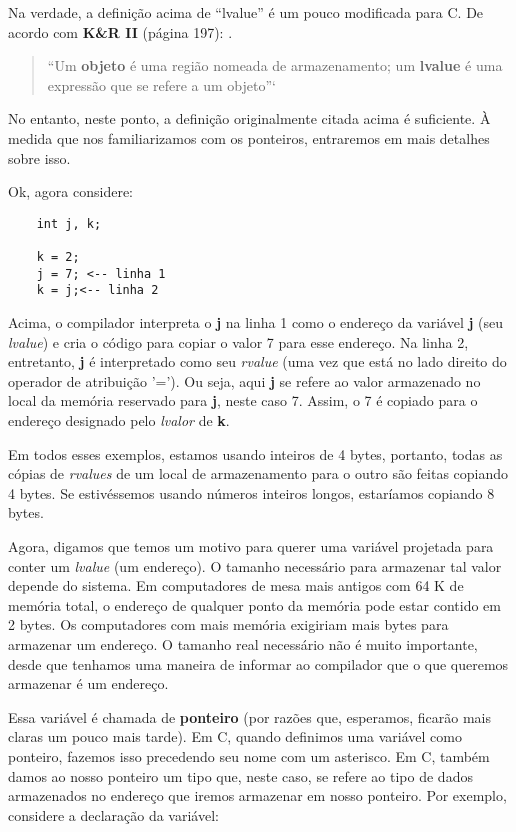 Na verdade, a definição acima de ``lvalue'' é um pouco modificada para C. De acordo com \textbf{K\&R II} (página 197): \cite{kr}.

\begin{quotation}
	``Um \textbf{objeto} é uma região nomeada de armazenamento; um \textbf{lvalue} é uma expressão que se refere a um objeto''`
\end{quotation}

No entanto, neste ponto, a definição originalmente citada acima é suficiente. À medida que nos familiarizamos com os ponteiros, entraremos em mais detalhes sobre isso.

Ok, agora considere:

\begin{lstlisting}
	int j, k;
	
	k = 2;
	j = 7; <-- linha 1
	k = j;<-- linha 2
\end{lstlisting}

Acima, o compilador interpreta o \textbf{j} na linha 1 como o endereço da variável \textbf{j} (seu \textit{lvalue}) e cria o código para copiar o valor 7 para esse endereço. Na linha 2, entretanto, \textbf{j} é interpretado como seu \textit{rvalue} (uma vez que está no lado direito do operador de atribuição '='). Ou seja, aqui \textbf{j} se refere ao valor armazenado no local da memória reservado para \textbf{j}, neste caso 7. Assim, o 7 é copiado para o endereço designado pelo \textit{lvalor} de \textbf{k}.

Em todos esses exemplos, estamos usando inteiros de 4 bytes, portanto, todas as cópias de \textit{rvalues} de um local de armazenamento para o outro são feitas copiando 4 bytes. Se estivéssemos usando números inteiros longos, estaríamos copiando 8 bytes.

Agora, digamos que temos um motivo para querer uma variável projetada para conter um \textit{lvalue} (um endereço). O tamanho necessário para armazenar tal valor depende do sistema. Em computadores de mesa mais antigos com 64 K de memória total, o endereço de qualquer ponto da memória pode estar contido em 2 bytes. Os computadores com mais memória exigiriam mais bytes para armazenar um endereço. O tamanho real necessário não é muito importante, desde que tenhamos uma maneira de informar ao compilador que o que queremos armazenar é um endereço.

Essa variável é chamada de \textbf{ponteiro} (por razões que, esperamos, ficarão mais claras um pouco mais tarde). Em C, quando definimos uma variável como ponteiro, fazemos isso precedendo seu nome com um asterisco. Em C, também damos ao nosso ponteiro um tipo que, neste caso, se refere ao tipo de dados armazenados no endereço que iremos armazenar em nosso ponteiro. Por exemplo, considere a declaração da variável:

